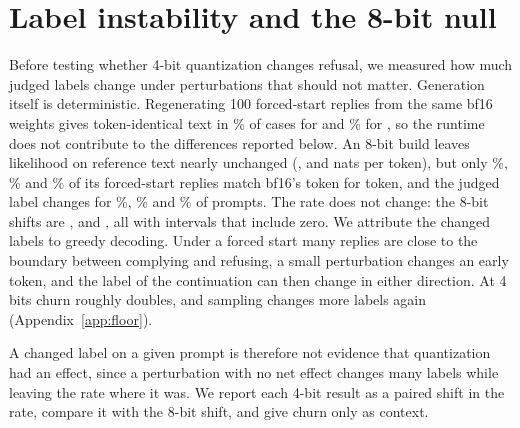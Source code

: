 \section{Label instability and the 8-bit null}
\label{sec:instrument}

Before testing whether 4-bit quantization changes refusal, we measured how much judged labels change under perturbations that should not matter. Generation itself is deterministic. Regenerating 100 forced-start replies from the same bf16 weights gives token-identical text in \% of cases for \qwen{} and \% for \llama, so the runtime does not contribute to the differences reported below. An 8-bit build leaves likelihood on reference text nearly unchanged (,  and  nats per token), but only \%, \% and \% of its forced-start replies match bf16's token for token, and the judged label changes for \%, \% and \% of prompts. The rate does not change: the 8-bit shifts are ,  and \pp{}, all with intervals that include zero. We attribute the changed labels to greedy decoding. Under a forced start many replies are close to the boundary between complying and refusing, a small perturbation changes an early token, and the label of the continuation can then change in either direction. At 4 bits churn roughly doubles, and sampling changes more labels again (Appendix~\ref{app:floor}).

A changed label on a given prompt is therefore not evidence that quantization had an effect, since a perturbation with no net effect changes many labels while leaving the rate where it was. We report each 4-bit result as a paired shift in the rate, compare it with the 8-bit shift, and give churn only as context.

